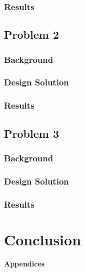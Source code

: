\documentclass[11pt]{article}
\begin{document}
\subsubsection{Results}


\subsection{Problem 2 }

\subsubsection{Background}

\subsubsection{Design Solution}


\subsubsection{Results}

\subsection{Problem 3}

\subsubsection{Background}


\subsubsection{Design Solution}


\subsubsection{Results}


\section{Conclusion}


\pagebreak

\textbf{Appendices}
\end{document}

